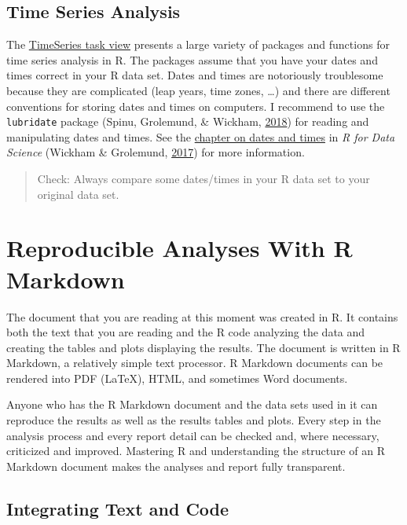 \documentclass[doc,floatsintext]{apa6}
\begin{document}
\subsection{Time Series Analysis}\label{time-series-analysis}

The
\href{https://cran.r-project.org/web/views/TimeSeries.html}{TimeSeries
task view} presents a large variety of packages and functions for time
series analysis in R. The packages assume that you have your dates and
times correct in your R data set. Dates and times are notoriously
troublesome because they are complicated (leap years, time zones,
\ldots{}) and there are different conventions for storing dates and
times on computers. I recommend to use the \texttt{lubridate} package
(Spinu, Grolemund, \& Wickham,
\protect\hyperlink{ref-R-lubridate}{2018}) for reading and manipulating
dates and times. See the
\href{https://r4ds.had.co.nz/dates-and-times.html}{chapter on dates and
times} in \emph{R for Data Science} (Wickham \& Grolemund,
\protect\hyperlink{ref-WickhamDataScienceImport2017}{2017}) for more
information.

\begin{quote}
Check: Always compare some dates/times in your R data set to your
original data set.
\end{quote}

\section{Reproducible Analyses With R Markdown}\label{rmarkdown}

The document that you are reading at this moment was created in R. It
contains both the text that you are reading and the R code analyzing the
data and creating the tables and plots displaying the results. The
document is written in R Markdown, a relatively simple text processor. R
Markdown documents can be rendered into PDF (LaTeX), HTML, and sometimes
Word documents.

Anyone who has the R Markdown document and the data sets used in it can
reproduce the results as well as the results tables and plots. Every
step in the analysis process and every report detail can be checked and,
where necessary, criticized and improved. Mastering R and understanding
the structure of an R Markdown document makes the analyses and report
fully transparent.

\subsection{Integrating Text and Code}\label{integratingtextcode}
\end{document}
